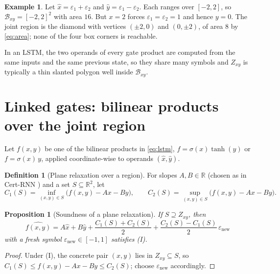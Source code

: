 \documentclass[11pt]{article}
\newtheorem{proposition}[theorem]{Proposition}
\theoremstyle{definition}
\newtheorem{definition}[theorem]{Definition}
\newtheorem{example}[theorem]{Example}
\theoremstyle{remark}
\newcommand{\R}{\mathbb{R}}
\newcommand{\eps}{\varepsilon}
\newcommand{\Bx}{\mathcal{B}}
\begin{document}
\begin{example}
Let $\hat x = \eps_1 + \eps_2$ and $\hat y = \eps_1 - \eps_2$. Each ranges over $[-2,2]$, so $\Bx_{xy} = [-2,2]^2$ with area $16$. But $x = 2$ forces $\eps_1 = \eps_2 = 1$ and hence $y = 0$. The joint region is the diamond with vertices $(\pm2,0)$ and $(0,\pm2)$, of area $8$ by \eqref{eq:area}; none of the four box corners is reachable.
\begin{center}
\end{center}
\end{example}

In an LSTM, the two operands of every gate product are computed from the same inputs and the same previous state, so they share many symbols and $Z_{xy}$ is typically a thin slanted polygon well inside $\Bx_{xy}$.

\section{Linked gates: bilinear products over the joint region}

Let $f(x,y)$ be one of the bilinear products in \eqref{eq:lstm}, $f = \sigma(x)\tanh(y)$ or $f = \sigma(x)\,y$, applied coordinate-wise to operands $(\hat x,\hat y)$.

\begin{definition}[Plane relaxation over a region]
For slopes $A, B\in\R$ (chosen as in Cert-RNN \cite{du2021}) and a set $S\subseteq\R^2$, let
\begin{equation}
C_1(S) = \inf_{(x,y)\in S}\bigl(f(x,y) - Ax - By\bigr),\qquad C_2(S) = \sup_{(x,y)\in S}\bigl(f(x,y) - Ax - By\bigr).
\end{equation}
\end{definition}

\begin{proposition}[Soundness of a plane relaxation]
If $S \supseteq Z_{xy}$, then
\begin{equation}
\widehat{f(x,y)} = A\hat x + B\hat y + \frac{C_1(S)+C_2(S)}{2} + \frac{C_2(S)-C_1(S)}{2}\,\eps_{\mathrm{new}}
\label{eq:bilinear}
\end{equation}
with a fresh symbol $\eps_{\mathrm{new}}\in[-1,1]$ satisfies (I).
\end{proposition}
\begin{proof}
Under (I), the concrete pair $(x,y)$ lies in $Z_{xy}\subseteq S$, so $C_1(S) \le f(x,y) - Ax - By \le C_2(S)$; choose $\eps_{\mathrm{new}}$ accordingly.
\end{proof}
\end{document}
